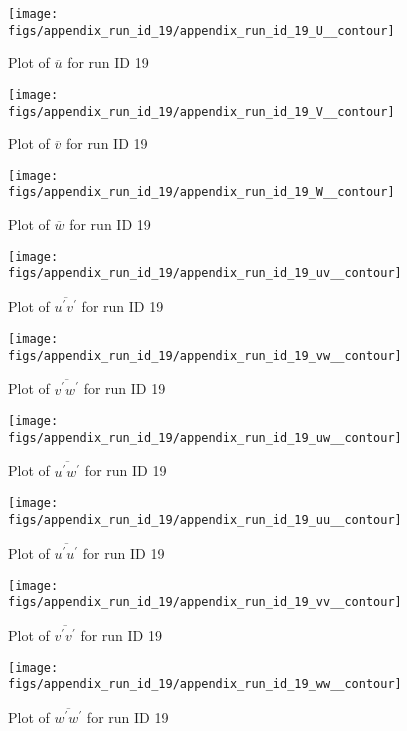 \begin{figure}[H]
\centering
\texttt{[image: figs/appendix\_run\_id\_19/appendix\_run\_id\_19\_U\_\_contour]}
\caption{Plot of $\overline{u}$ for run ID 19}
\label{fig:appendix_run_id_19_U__contour}
\end{figure}


\begin{figure}[H]
\centering
\texttt{[image: figs/appendix\_run\_id\_19/appendix\_run\_id\_19\_V\_\_contour]}
\caption{Plot of $\overline{v}$ for run ID 19}
\label{fig:appendix_run_id_19_V__contour}
\end{figure}


\begin{figure}[H]
\centering
\texttt{[image: figs/appendix\_run\_id\_19/appendix\_run\_id\_19\_W\_\_contour]}
\caption{Plot of $\overline{w}$ for run ID 19}
\label{fig:appendix_run_id_19_W__contour}
\end{figure}


\begin{figure}[H]
\centering
\texttt{[image: figs/appendix\_run\_id\_19/appendix\_run\_id\_19\_uv\_\_contour]}
\caption{Plot of $\overline{u^\prime v^\prime}$ for run ID 19}
\label{fig:appendix_run_id_19_uv__contour}
\end{figure}


\begin{figure}[H]
\centering
\texttt{[image: figs/appendix\_run\_id\_19/appendix\_run\_id\_19\_vw\_\_contour]}
\caption{Plot of $\overline{v^\prime w^\prime}$ for run ID 19}
\label{fig:appendix_run_id_19_vw__contour}
\end{figure}


\begin{figure}[H]
\centering
\texttt{[image: figs/appendix\_run\_id\_19/appendix\_run\_id\_19\_uw\_\_contour]}
\caption{Plot of $\overline{u^\prime w^\prime}$ for run ID 19}
\label{fig:appendix_run_id_19_uw__contour}
\end{figure}


\begin{figure}[H]
\centering
\texttt{[image: figs/appendix\_run\_id\_19/appendix\_run\_id\_19\_uu\_\_contour]}
\caption{Plot of $\overline{u^\prime u^\prime}$ for run ID 19}
\label{fig:appendix_run_id_19_uu__contour}
\end{figure}


\begin{figure}[H]
\centering
\texttt{[image: figs/appendix\_run\_id\_19/appendix\_run\_id\_19\_vv\_\_contour]}
\caption{Plot of $\overline{v^\prime v^\prime}$ for run ID 19}
\label{fig:appendix_run_id_19_vv__contour}
\end{figure}


\begin{figure}[H]
\centering
\texttt{[image: figs/appendix\_run\_id\_19/appendix\_run\_id\_19\_ww\_\_contour]}
\caption{Plot of $\overline{w^\prime w^\prime}$ for run ID 19}
\label{fig:appendix_run_id_19_ww__contour}
\end{figure}


